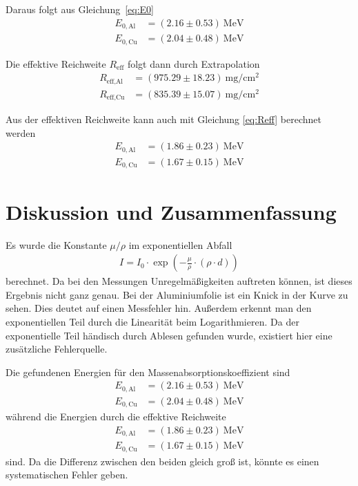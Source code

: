 \documentclass{article}
\begin{document}
Daraus folgt aus Gleichung~\eqref{eq:E0}
\begin{align*}
E_{0,\text{Al}} &= (2.16\pm0.53)~\text{MeV}\\ 
E_{0,\text{Cu}} &= (2.04\pm0.48)~\text{MeV}
\end{align*}



Die effektive Reichweite $R_\text{eff}$ folgt dann durch Extrapolation 
\begin{align*}
R_{\text{eff},\text{Al}} &= (975.29\pm 18.23)~\text{mg}/\text{cm}^2 \\
R_{\text{eff},\text{Cu}} &= (835.39\pm 15.07)~\text{mg}/\text{cm}^2 
\end{align*}


Aus der effektiven Reichweite kann auch mit Gleichung \eqref{eq:Reff} berechnet werden
\begin{align*}
E_{0,\text{Al}} &= (1.86 \pm 0.23)~\text{MeV} \\ 
E_{0,\text{Cu}} &= (1.67 \pm 0.15)~\text{MeV}
\end{align*}




\section{Diskussion und Zusammenfassung}

Es wurde die Konstante $\mu/\rho$ im exponentiellen Abfall
\begin{align*}
I = I_0\cdot \exp\left(-\frac{\mu}{\rho} \cdot (\rho\cdot d)\right) 
\end{align*}
berechnet. Da bei den Messungen Unregelmäßigkeiten auftreten können, ist dieses Ergebnis nicht ganz genau. Bei der Aluminiumfolie ist ein Knick in der Kurve zu sehen. Dies deutet auf einen Messfehler hin. Außerdem erkennt man den exponentiellen Teil durch die Linearität beim Logarithmieren. Da der exponentielle Teil händisch durch Ablesen gefunden wurde, existiert hier eine zusätzliche Fehlerquelle.

Die gefundenen Energien für den Massenabsorptionskoeffizient sind
\begin{align*}
E_{0,\text{Al}} &= (2.16\pm0.53)~\text{MeV}\\ 
E_{0,\text{Cu}} &= (2.04\pm0.48)~\text{MeV}
\end{align*}
während die Energien durch die effektive Reichweite 
\begin{align*}
E_{0,\text{Al}} &= (1.86 \pm 0.23)~\text{MeV} \\ 
E_{0,\text{Cu}} &= (1.67 \pm 0.15)~\text{MeV}
\end{align*}
sind. Da die Differenz zwischen den beiden gleich groß ist, könnte es einen systematischen Fehler geben. 
\end{document}
